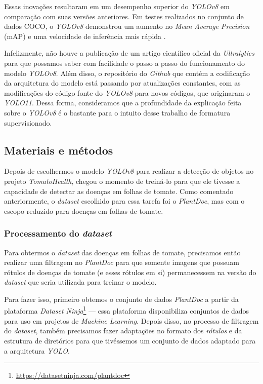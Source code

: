 Essas inovações resultaram em um desempenho superior do \emph{YOLOv8} em comparação com suas versões anteriores. Em testes realizados no conjunto de dados COCO, o \emph{YOLOv8} demonstrou um aumento no \emph{Mean Average Precision} (mAP) e uma velocidade de inferência mais rápida \citep{ultralytics_yolov8_results}.

Infelizmente, não houve a publicação de um artigo científico oficial da \emph{Ultralytics} para que possamos saber com facilidade o passo a passo do funcionamento do modelo \emph{YOLOv8}. Além disso, o repositório do \emph{Github} que contém a codificação da arquitetura do modelo está passando por atualizações constantes, com as modificações do código fonte do \emph{YOLOv8} para novos códigos, que originaram o \emph{YOLO11}. Dessa forma, consideramos que a profundidade da explicação feita sobre o \emph{YOLOv8} é o bastante para o intuito desse trabalho de formatura supervisionado.


\subsection{Materiais e métodos}
\label{sec:treinamento}
Depois de escolhermos o modelo \emph{YOLOv8} para realizar a detecção de objetos no projeto \emph{TomatoHealth}, chegou o momento de treiná-lo para que ele tivesse a capacidade de detectar as doenças em folhas de tomate. Como comentado anteriormente, o \emph{dataset} escolhido para essa tarefa foi o \emph{PlantDoc}, mas com o escopo reduzido para doenças em folhas de tomate.

\subsubsection{Processamento do \emph{dataset}}
Para obtermos o \emph{dataset} das doenças em folhas de tomate, precisamos então realizar uma filtragem no \emph{PlantDoc} para que somente imagens que possuam rótulos de doenças de tomate (e esses rótulos em si) permanecessem na versão do \emph{dataset} que seria utilizada para treinar o modelo.

Para fazer isso, primeiro obtemos o conjunto de dados \emph{PlantDoc} a partir da plataforma \emph{Dataset Ninja}\footnote{\url{https://datasetninja.com/plantdoc}} --- essa plataforma disponibiliza conjuntos de dados para uso em projetos de \emph{Machine Learning}. Depois disso, no processo de filtragem do \emph{dataset}, também precisamos fazer adaptações no formato dos \emph{rótulos} e da estrutura de diretórios para que tivéssemos um conjunto de dados adaptado para a arquitetura \emph{YOLO}.

